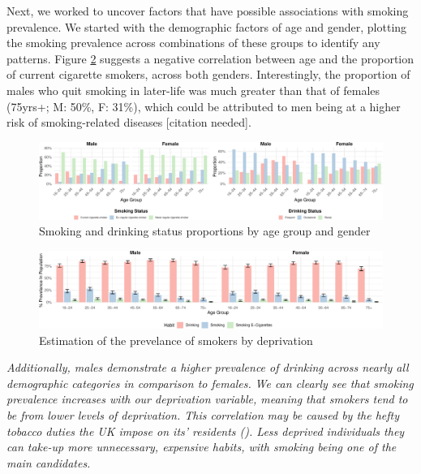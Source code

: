 \documentclass[
  11pt,
]{article}
\begin{document}
Next, we worked to uncover factors that have possible associations with
smoking prevalence. We started with the demographic factors of age and
gender, plotting the smoking prevalence across combinations of these
groups to identify any patterns. Figure \ref{fig:output-prevelance-plot}
suggests a negative correlation between age and the proportion of
current cigarette smokers, across both genders. Interestingly, the
proportion of males who quit smoking in later-life was much greater than
that of females (75yrs+; M: 50\%, F: 31\%), which could be attributed to
men being at a higher risk of smoking-related diseases {[}citation
needed{]}.

\begin{figure}[H]
\includegraphics{Coursework_files/figure-latex/output-smoking-drinking-age-plot-1} \caption{Smoking and drinking status proportions by age group and gender}\label{fig:output-smoking-drinking-age-plot}
\end{figure}

\begin{figure}[H]
\includegraphics{Coursework_files/figure-latex/output-prevelance-plot-1} \caption{Estimation of the prevelance of smokers by deprivation}\label{fig:output-prevelance-plot}
\end{figure}

\emph{Additionally, males demonstrate a higher prevalence of drinking
across nearly all demographic categories in comparison to females.}
\emph{We can clearly see that smoking prevalence increases with our
deprivation variable, meaning that smokers tend to be from lower levels
of deprivation. This correlation may be caused by the hefty tobacco
duties the UK impose on its' residents (). Less deprived individuals they can take-up more unnecessary,
expensive habits, with smoking being one of the main candidates.}
\end{document}
